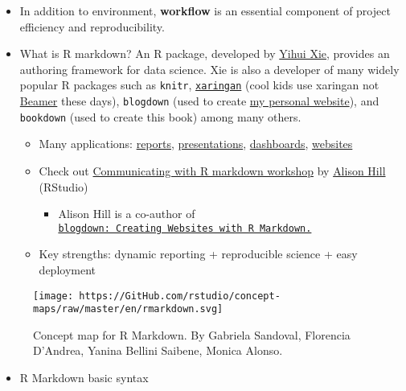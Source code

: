 \documentclass[
]{book}
\providecommand{\tightlist}{%
  \setlength{\itemsep}{0pt}\setlength{\parskip}{0pt}}
\begin{document}
\begin{itemize}
\item
  In addition to environment, \textbf{workflow} is an essential component of project efficiency and reproducibility.
\item
  What is R markdown? An R package, developed by \href{https://yihui.org/en/}{Yihui Xie}, provides an authoring framework for data science. Xie is also a developer of many widely popular R packages such as \texttt{knitr}, \href{https://GitHub.com/yihui/xaringan}{\texttt{xaringan}} (cool kids use xaringan not \href{https://en.wikipedia.org/wiki/Beamer_(LaTeX)}{Beamer} these days), \texttt{blogdown} (used to create \href{https://jaeyk.GitHub.io/}{my personal website}), and \texttt{bookdown} (used to create this book) among many others.

  \begin{itemize}
  \tightlist
  \item
    Many applications: \href{https://rstudio.GitHub.io/distill/basics.html}{reports}, \href{https://bookdown.org/yihui/rmarkdown/xaringan.html}{presentations}, \href{https://rmarkdown.rstudio.com/flexdashboard/}{dashboards}, \href{https://bookdown.org/yihui/rmarkdown/websites.html}{websites}\\
  \item
    Check out \href{https://ysc-rmarkdown.netlify.app/}{Communicating with R markdown workshop} by \href{https://alison.rbind.io/}{Alison Hill} (RStudio)

    \begin{itemize}
    \tightlist
    \item
      Alison Hill is a co-author of \href{https://bookdown.org/yihui/blogdown/}{\texttt{blogdown:\ Creating\ Websites\ with\ R\ Markdown.}}
    \end{itemize}
  \item
    Key strengths: dynamic reporting + reproducible science + easy deployment
  \end{itemize}
\end{itemize}

\begin{figure}
\centering
\texttt{[image: https://GitHub.com/rstudio/concept-maps/raw/master/en/rmarkdown.svg]}
\caption{Concept map for R Markdown. By Gabriela Sandoval, Florencia D'Andrea, Yanina Bellini Saibene, Monica Alonso.}
\end{figure}

\begin{itemize}
\tightlist
\item
  R Markdown basic syntax
\end{itemize}
\end{document}
